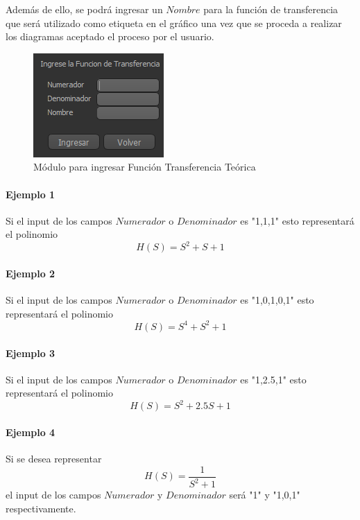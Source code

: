 Además de ello, se podrá ingresar un $Nombre$ para la función de transferencia que será utilizado como etiqueta en el gráfico una vez que se proceda a realizar los diagramas aceptado el proceso por el usuario.

\begin{figure}[!htb] 
    \centering 
    \includegraphics [scale=0.8]{../EJ2/LatexScreenshots/plotToolTransferFunctionInput.png} 
    \caption{Módulo para ingresar Función Transferencia Teórica}
    \label{fig:transferFunctionInputPlotTool}
\end{figure}

\paragraph{Ejemplo 1}

Si el input de los campos $Numerador$ o $Denominador$ es "1,1,1" esto representará el polinomio  $$H(S) = S^2 + S + 1 $$

\paragraph{Ejemplo 2}

Si el input de los campos $Numerador$ o $Denominador$ es "1,0,1,0,1" esto representará el polinomio  $$H(S) = S^4 + S^2 + 1 $$

\paragraph{Ejemplo 3}

Si el input de los campos $Numerador$ o $Denominador$ es "1,2.5,1" esto representará el polinomio  $$H(S) = S^2 + 2.5S + 1 $$

\paragraph{Ejemplo 4}

Si se desea representar $$H(S) = \frac{1}{S^2 + 1} $$el input de los campos $Numerador$ y $Denominador$ será "1" y "1,0,1" respectivamente.

